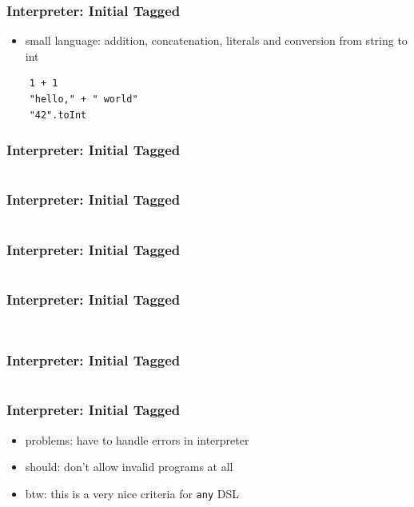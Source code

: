 \documentclass[aspectratio=169, hyperref={colorlinks, linkcolor=beamer@centricgreen}, urlcolor=links]{beamer}
\begin{document}
\begin{frame}[fragile]
  \frametitle{Interpreter: Initial Tagged}
  \begin{itemize}
  \item small language: addition, concatenation, literals and conversion from string to int
  \end{itemize}
  \begin{verbatim}
    1 + 1
    "hello," + " world"
    "42".toInt
  \end{verbatim}
\end{frame}

\begin{frame}[fragile]
  \frametitle{Interpreter: Initial Tagged}
  \inputminted[fontsize=\footnotesize]{scala}{snippets/initial-tagged-expr.scala}
\end{frame}

\begin{frame}[fragile]
  \frametitle{Interpreter: Initial Tagged}
  \inputminted[fontsize=\footnotesize]{scala}{snippets/initial-tagged-sample.scala}
\end{frame}

\begin{frame}[fragile]
  \frametitle{Interpreter: Initial Tagged}
  \inputminted[fontsize=\footnotesize]{scala}{snippets/initial-tagged-interp-wrong.scala}
\end{frame}

\begin{frame}[fragile]
  \frametitle{Interpreter: Initial Tagged}
  \inputminted[fontsize=\footnotesize]{scala}{snippets/initial-tagged-result.scala}
  \vspace{5mm}
  \inputminted[fontsize=\footnotesize]{scala}{snippets/initial-tagged-interp.scala}
\end{frame}

\begin{frame}[fragile]
  \frametitle{Interpreter: Initial Tagged}
  \inputminted[fontsize=\footnotesize]{scala}{snippets/initial-tagged-add.scala}
\end{frame}

\begin{frame}[fragile]
  \frametitle{Interpreter: Initial Tagged}
  \begin{itemize}
  \item problems: have to handle errors in interpreter
  \item should: don't allow invalid programs at all
  \item btw: this is a very nice criteria for \texttt{any} DSL
  \end{itemize}
\end{frame}
\end{document}
